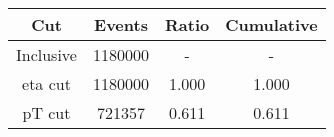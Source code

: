 \begin{tabular}{|c||c|c|c|}
\hline
Cut & Events & Ratio & Cumulative \\\hline
Inclusive & 1180000 & - & - \\
eta cut & 1180000 & 1.000 & 1.000 \\
pT cut & 721357 & 0.611 & 0.611 \\
\end{tabular}